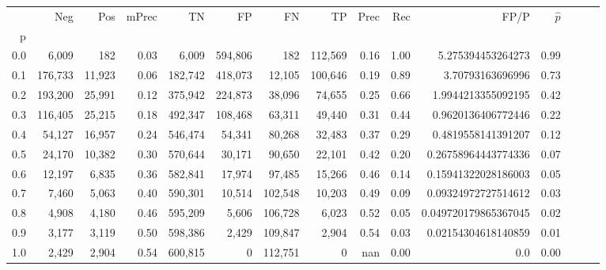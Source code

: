 \begin{tabular}{rrrrrrrrrrrrrrr}
\toprule
{} &      Neg &     Pos & mPrec &       TN &       FP &       FN &       TP &  Prec &   Rec &                  FP/P & $\hat{p}$ \\
p   &          &         &       &          &          &          &          &       &       &                       &           \\
\midrule
0.0 &    6,009 &     182 &  0.03 &    6,009 &  594,806 &      182 &  112,569 &  0.16 &  1.00 &     5.275394453264273 &      0.99 \\
0.1 &  176,733 &  11,923 &  0.06 &  182,742 &  418,073 &   12,105 &  100,646 &  0.19 &  0.89 &      3.70793163696996 &      0.73 \\
0.2 &  193,200 &  25,991 &  0.12 &  375,942 &  224,873 &   38,096 &   74,655 &  0.25 &  0.66 &    1.9944213355092195 &      0.42 \\
0.3 &  116,405 &  25,215 &  0.18 &  492,347 &  108,468 &   63,311 &   49,440 &  0.31 &  0.44 &    0.9620136406772446 &      0.22 \\
0.4 &   54,127 &  16,957 &  0.24 &  546,474 &   54,341 &   80,268 &   32,483 &  0.37 &  0.29 &    0.4819558141391207 &      0.12 \\
0.5 &   24,170 &  10,382 &  0.30 &  570,644 &   30,171 &   90,650 &   22,101 &  0.42 &  0.20 &   0.26758964443774336 &      0.07 \\
0.6 &   12,197 &   6,835 &  0.36 &  582,841 &   17,974 &   97,485 &   15,266 &  0.46 &  0.14 &   0.15941322028186003 &      0.05 \\
0.7 &    7,460 &   5,063 &  0.40 &  590,301 &   10,514 &  102,548 &   10,203 &  0.49 &  0.09 &   0.09324972727514612 &      0.03 \\
0.8 &    4,908 &   4,180 &  0.46 &  595,209 &    5,606 &  106,728 &    6,023 &  0.52 &  0.05 &  0.049720179865367045 &      0.02 \\
0.9 &    3,177 &   3,119 &  0.50 &  598,386 &    2,429 &  109,847 &    2,904 &  0.54 &  0.03 &   0.02154304618140859 &      0.01 \\
1.0 &    2,429 &   2,904 &  0.54 &  600,815 &        0 &  112,751 &        0 &   nan &  0.00 &                   0.0 &      0.00 \\
\bottomrule
\end{tabular}
